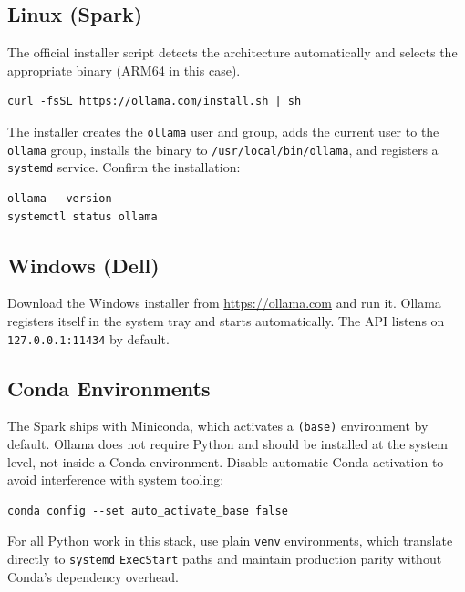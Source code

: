 \subsection{Linux (Spark)}

The official installer script detects the architecture automatically and
selects the appropriate binary (ARM64 in this case).

\begin{lstlisting}[style=bashstyle, caption={Install Ollama on Ubuntu}]
curl -fsSL https://ollama.com/install.sh | sh
\end{lstlisting}

The installer creates the \texttt{ollama} user and group, adds the
current user to the \texttt{ollama} group, installs the binary to
\texttt{/usr/local/bin/ollama}, and registers a \texttt{systemd} service.
Confirm the installation:

\begin{lstlisting}[style=bashstyle]
ollama --version
systemctl status ollama
\end{lstlisting}

\subsection{Windows (Dell)}

Download the Windows installer from \url{https://ollama.com} and run it.
Ollama registers itself in the system tray and starts automatically. The
API listens on \texttt{127.0.0.1:11434} by default.

\subsection{Conda Environments}

The Spark ships with Miniconda, which activates a \texttt{(base)}
environment by default. Ollama does not require Python and should be
installed at the system level, not inside a Conda environment. Disable
automatic Conda activation to avoid interference with system tooling:

\begin{lstlisting}[style=bashstyle]
conda config --set auto_activate_base false
\end{lstlisting}

For all Python work in this stack, use plain \texttt{venv} environments,
which translate directly to \texttt{systemd} \texttt{ExecStart} paths
and maintain production parity without Conda's dependency overhead.

